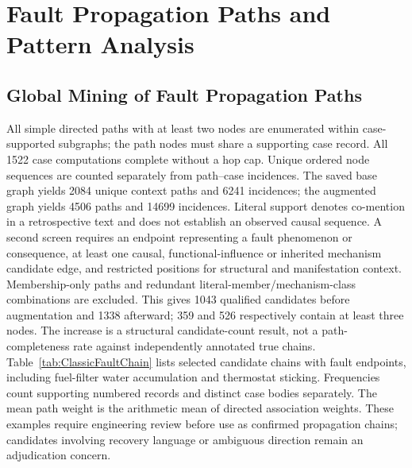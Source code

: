 \documentclass[
aps,%
12pt,%
final,%
notitlepage,%
oneside,%
onecolumn,%
nobibnotes,%
nofootinbib,%
superscriptaddress,%
noshowpacs,%
centertags]%
{revtex4}
\begin{document}
\section{Fault Propagation Paths and Pattern Analysis}
\subsection{Global Mining of Fault Propagation Paths}
All simple directed paths with at least two nodes are enumerated within case-supported subgraphs; the path nodes must share a supporting case record. All 1522 case computations complete without a hop cap. Unique ordered node sequences are counted separately from path--case incidences. The saved base graph yields 2084 unique context paths and 6241 incidences; the augmented graph yields 4506 paths and 14699 incidences. Literal support denotes co-mention in a retrospective text and does not establish an observed causal sequence.
A second screen requires an endpoint representing a fault phenomenon or consequence, at least one causal, functional-influence or inherited mechanism candidate edge, and restricted positions for structural and manifestation context. Membership-only paths and redundant literal-member/mechanism-class combinations are excluded. This gives 1043 qualified candidates before augmentation and 1338 afterward; 359 and 526 respectively contain at least three nodes. The increase is a structural candidate-count result, not a path-completeness rate against independently annotated true chains.
Table~\ref{tab:ClassicFaultChain} lists selected candidate chains with fault endpoints, including fuel-filter water accumulation and thermostat sticking. Frequencies count supporting numbered records and distinct case bodies separately. The mean path weight is the arithmetic mean of directed association weights. These examples require engineering review before use as confirmed propagation chains; candidates involving recovery language or ambiguous direction remain an adjudication concern.
\end{document}
